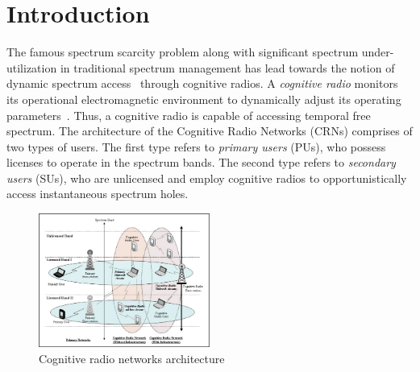 \chapter{Introduction}\label{intro}
The famous spectrum scarcity problem along with significant spectrum under-utilization in traditional spectrum management has lead towards the notion of dynamic spectrum access~\cite{akyildiz2006next} through cognitive radios. A \textit{cognitive radio} monitors its operational electromagnetic environment to dynamically adjust its operating parameters~\cite{Mitola}. Thus, a cognitive radio is capable of accessing temporal free spectrum. The architecture of the Cognitive Radio Networks (CRNs) comprises of two types of users. The first type refers to \textit{primary users} (PUs), who possess licenses to operate in the spectrum bands. The second type refers to \textit{secondary users} (SUs), who are unlicensed and employ cognitive radios to opportunistically access instantaneous spectrum holes.

\begin{figure}[!htbp]
    \begin{center}
        \includegraphics[width=0.5\textwidth]{myFigures/cogArch.jpg}
        \caption{Cognitive radio networks architecture~\cite{bwnGatechProjectDescription}}
        \label{fig:cogArch}
    \end{center}
\end{figure}


